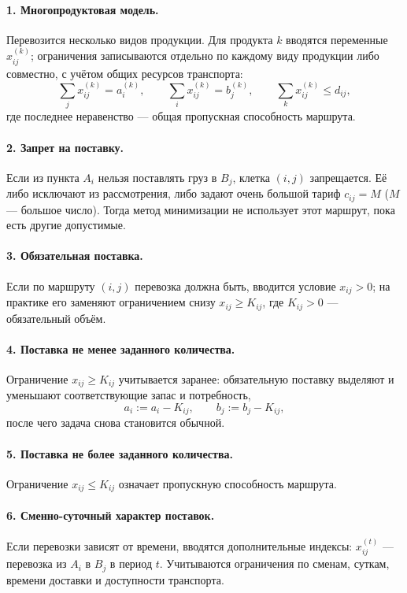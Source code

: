 \paragraph{1. Многопродуктовая модель.}
Перевозится несколько видов продукции. Для продукта $k$ вводятся переменные
$x_{ij}^{(k)}$; ограничения записываются отдельно по каждому виду продукции
либо совместно, с учётом общих ресурсов транспорта:
\[
  \sum_{j} x_{ij}^{(k)} = a_i^{(k)} , \qquad
  \sum_{i} x_{ij}^{(k)} = b_j^{(k)} , \qquad
  \sum_{k} x_{ij}^{(k)} \le d_{ij} ,
\]
где последнее неравенство — общая пропускная способность маршрута.

\paragraph{2. Запрет на поставку.}
Если из пункта $A_i$ нельзя поставлять груз в $B_j$, клетка $(i,j)$
запрещается. Её либо исключают из рассмотрения, либо задают очень большой
тариф $c_{ij} = M$ ($M$ — большое число). Тогда метод минимизации не
использует этот маршрут, пока есть другие допустимые.

\paragraph{3. Обязательная поставка.}
Если по маршруту $(i,j)$ перевозка должна быть, вводится условие
$x_{ij} > 0$; на практике его заменяют ограничением снизу
$x_{ij} \ge K_{ij}$, где $K_{ij} > 0$ — обязательный объём.

\paragraph{4. Поставка не менее заданного количества.}
Ограничение $x_{ij} \ge K_{ij}$ учитывается заранее: обязательную поставку
выделяют и уменьшают соответствующие запас и потребность,
\[
  a_i := a_i - K_{ij} , \qquad b_j := b_j - K_{ij} ,
\]
после чего задача снова становится обычной.

\paragraph{5. Поставка не более заданного количества.}
Ограничение $x_{ij} \le K_{ij}$ означает пропускную способность маршрута.

\paragraph{6. Сменно-суточный характер поставок.}
Если перевозки зависят от времени, вводятся дополнительные индексы:
$x_{ij}^{(t)}$ — перевозка из $A_i$ в $B_j$ в период $t$. Учитываются
ограничения по сменам, суткам, времени доставки и доступности транспорта.

